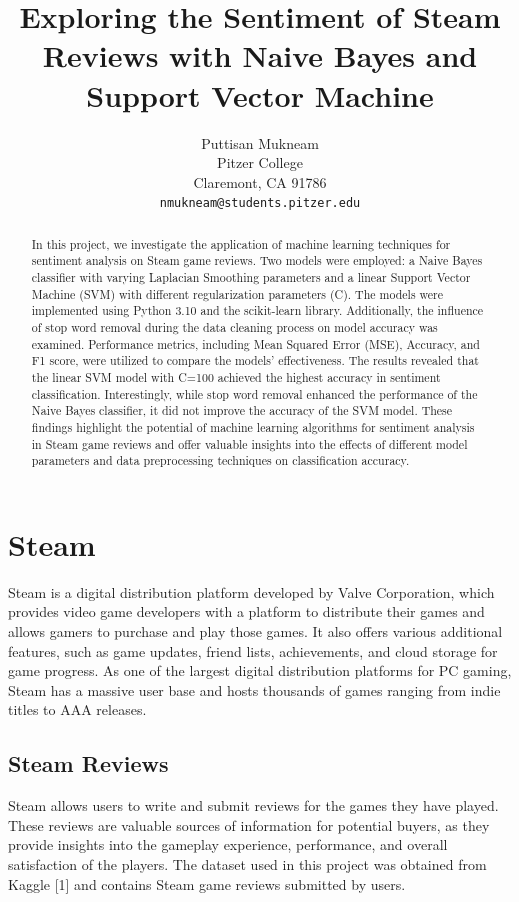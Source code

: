 \documentclass{article}
\title{Exploring the Sentiment of Steam Reviews with Naive Bayes and Support Vector Machine}
\author{
  Puttisan Mukneam \\
  Pitzer College\\
  Claremont, CA 91786 \\
  \texttt{nmukneam@students.pitzer.edu}
}
\begin{document}
\maketitle


\begin{abstract}
In this project, we investigate the application of machine learning techniques for sentiment analysis on Steam game reviews. Two models were employed: a Naive Bayes classifier with varying Laplacian Smoothing parameters and a linear Support Vector Machine (SVM) with different regularization parameters (C). The models were implemented using Python 3.10 and the scikit-learn library. Additionally, the influence of stop word removal during the data cleaning process on model accuracy was examined. Performance metrics, including Mean Squared Error (MSE), Accuracy, and F1 score, were utilized to compare the models' effectiveness. The results revealed that the linear SVM model with C=100 achieved the highest accuracy in sentiment classification. Interestingly, while stop word removal enhanced the performance of the Naive Bayes classifier, it did not improve the accuracy of the SVM model. These findings highlight the potential of machine learning algorithms for sentiment analysis in Steam game reviews and offer valuable insights into the effects of different model parameters and data preprocessing techniques on classification accuracy.
\end{abstract}

\section{Steam}

Steam is a digital distribution platform developed by Valve Corporation, which provides video game developers with a platform to distribute their games and allows gamers to purchase and play those games. It also offers various additional features, such as game updates, friend lists, achievements, and cloud storage for game progress. As one of the largest digital distribution platforms for PC gaming, Steam has a massive user base and hosts thousands of games ranging from indie titles to AAA releases.

\subsection{Steam Reviews}

Steam allows users to write and submit reviews for the games they have played. These reviews are valuable sources of information for potential buyers, as they provide insights into the gameplay experience, performance, and overall satisfaction of the players. The dataset used in this project was obtained from Kaggle [1] and contains Steam game reviews submitted by users.
\end{document}
